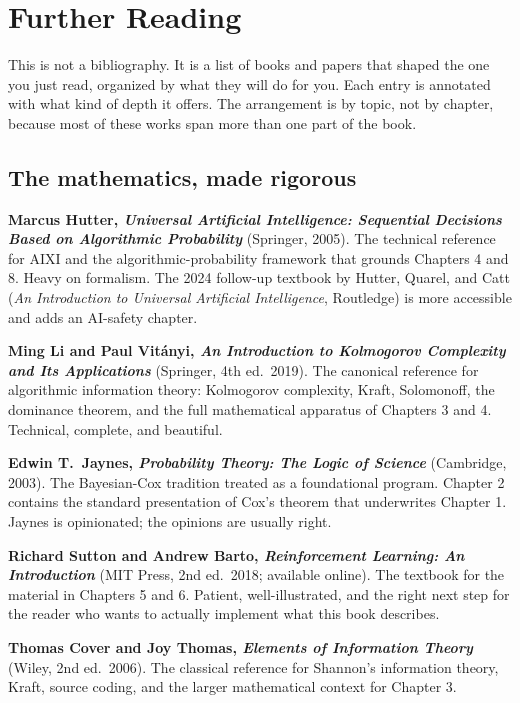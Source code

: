 \chapter*{Further Reading}

This is not a bibliography. It is a list of books and papers that shaped the one you just read, organized by what they will do for you. Each entry is annotated with what kind of depth it offers. The arrangement is by topic, not by chapter, because most of these works span more than one part of the book.

\section*{The mathematics, made rigorous}

\textbf{Marcus Hutter, \textit{Universal Artificial Intelligence: Sequential Decisions Based on Algorithmic Probability}} (Springer, 2005). The technical reference for AIXI and the algorithmic-probability framework that grounds Chapters 4 and 8. Heavy on formalism. The 2024 follow-up textbook by Hutter, Quarel, and Catt (\textit{An Introduction to Universal Artificial Intelligence}, Routledge) is more accessible and adds an AI-safety chapter.

\textbf{Ming Li and Paul Vit\'anyi, \textit{An Introduction to Kolmogorov Complexity and Its Applications}} (Springer, 4th ed.\ 2019). The canonical reference for algorithmic information theory: Kolmogorov complexity, Kraft, Solomonoff, the dominance theorem, and the full mathematical apparatus of Chapters 3 and 4. Technical, complete, and beautiful.

\textbf{Edwin T.\ Jaynes, \textit{Probability Theory: The Logic of Science}} (Cambridge, 2003). The Bayesian-Cox tradition treated as a foundational program. Chapter 2 contains the standard presentation of Cox's theorem that underwrites Chapter 1. Jaynes is opinionated; the opinions are usually right.

\textbf{Richard Sutton and Andrew Barto, \textit{Reinforcement Learning: An Introduction}} (MIT Press, 2nd ed.\ 2018; available online). The textbook for the material in Chapters 5 and 6. Patient, well-illustrated, and the right next step for the reader who wants to actually implement what this book describes.

\textbf{Thomas Cover and Joy Thomas, \textit{Elements of Information Theory}} (Wiley, 2nd ed.\ 2006). The classical reference for Shannon's information theory, Kraft, source coding, and the larger mathematical context for Chapter 3.

